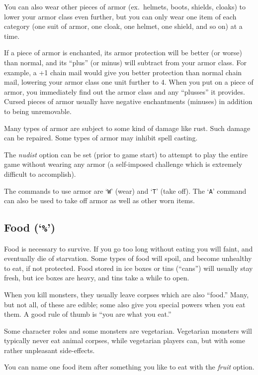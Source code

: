 \nd You can also wear other pieces of armor (ex.\ helmets, boots,
shields, cloaks)
to lower your armor class even further, but you can only wear one item
of each category (one suit of armor, one cloak, one helmet, one
shield, and so on) at a time.

If a piece of armor is enchanted, its armor protection will be better
(or worse) than normal, and its ``plus'' (or minus) will subtract from
your armor class.  For example, a +1 chain mail would give you
better protection than normal chain mail, lowering your armor class one
unit further to 4.  When you put on a piece of armor, you immediately
find out the armor class and any ``plusses'' it provides.  Cursed
pieces of armor usually have negative enchantments (minuses) in
addition to being unremovable.

Many types of armor are subject to some kind of damage like rust.  Such
damage can be repaired.  Some types of armor may inhibit spell casting.

The {\it nudist\/} option can be set (prior to game start) to attempt to
play the entire game without wearing any armor (a self-imposed challenge
which is extremely difficult to accomplish).

The commands to use armor are `{\tt W}' (wear) and `{\tt T}' (take off).
The `{\tt A}' command can also be used to take off armor as well as other
worn items.

\subsection*{Food (`{\tt \%}')}

Food is necessary to survive.  If you go too long without eating you
will faint, and eventually die of starvation.
Some types of food will spoil, and become unhealthy to eat,
if not protected.
Food stored in ice boxes or tins (``cans'')
will usually stay fresh, but ice boxes are heavy, and tins
take a while to open.

When you kill monsters, they usually leave corpses which are also
``food.''  Many, but not all, of these are edible; some also give you
special powers when you eat them.  A good rule of thumb is ``you are
what you eat.''

Some character roles and some monsters are vegetarian.  Vegetarian monsters
will typically never eat animal corpses, while vegetarian players can,
but with some rather unpleasant side-effects.

You can name one food item after something you like to eat with the
{\it fruit\/} option.

